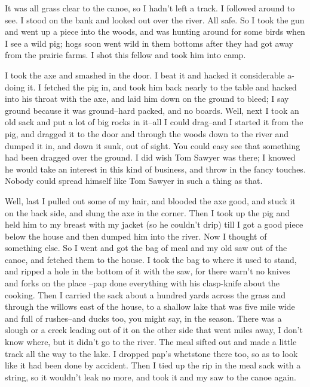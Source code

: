 It was all grass clear to the canoe, so I hadn't left a track.  I
followed around to see.  I stood on the bank and looked out over the
river.  All safe.  So I took the gun and went up a piece into the woods,
and was hunting around for some birds when I see a wild pig; hogs soon
went wild in them bottoms after they had got away from the prairie farms.
I shot this fellow and took him into camp.

I took the axe and smashed in the door.  I beat it and hacked it
considerable a-doing it.  I fetched the pig in, and took him back nearly
to the table and hacked into his throat with the axe, and laid him down
on the ground to bleed; I say ground because it was ground--hard packed,
and no boards.  Well, next I took an old sack and put a lot of big rocks
in it--all I could drag--and I started it from the pig, and dragged it
to the door and through the woods down to the river and dumped it in, and
down it sunk, out of sight.  You could easy see that something had been
dragged over the ground.  I did wish Tom Sawyer was there; I knowed he
would take an interest in this kind of business, and throw in the fancy
touches.  Nobody could spread himself like Tom Sawyer in such a thing as
that.

Well, last I pulled out some of my hair, and blooded the axe good, and
stuck it on the back side, and slung the axe in the corner.  Then I took
up the pig and held him to my breast with my jacket (so he couldn't drip)
till I got a good piece below the house and then dumped him into the
river.  Now I thought of something else.  So I went and got the bag of
meal and my old saw out of the canoe, and fetched them to the house.  I
took the bag to where it used to stand, and ripped a hole in the bottom
of it with the saw, for there warn't no knives and forks on the place
--pap done everything with his clasp-knife about the cooking.  Then I
carried the sack about a hundred yards across the grass and through the
willows east of the house, to a shallow lake that was five mile wide and
full of rushes--and ducks too, you might say, in the season.  There was a
slough or a creek leading out of it on the other side that went miles
away, I don't know where, but it didn't go to the river.  The meal sifted
out and made a little track all the way to the lake.  I dropped pap's
whetstone there too, so as to look like it had been done by accident.
Then I tied up the rip in the meal sack with a string, so it wouldn't
leak no more, and took it and my saw to the canoe again.

